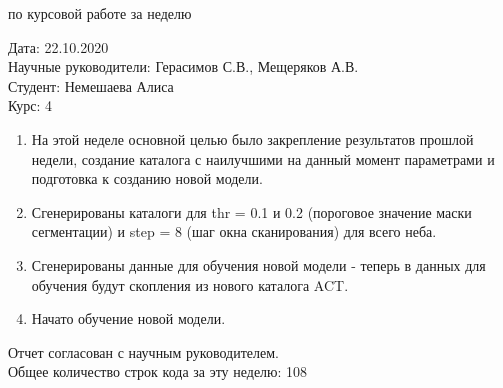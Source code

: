\documentclass{article}
\begin{document}
\begin{center}{ по курсовой работе за неделю\\}\end{center}
Дата: 22.10.2020\\
Научные руководители: Герасимов С.В., Мещеряков А.В.\\
Студент: Немешаева Алиса\\
Курс: 4\\

\renewcommand{\labelitemi}{$\blacksquare$}
\renewcommand\labelitemii{$\square$}
\begin{enumerate}
    \item На этой неделе основной целью было закрепление результатов прошлой недели, создание 
        каталога с наилучшими на данный момент параметрами и подготовка к созданию новой модели.\\
    \item Сгенерированы каталоги для thr = 0.1 и 0.2 (пороговое значение маски сегментации) и 
        step = 8 (шаг окна сканирования) для всего неба.\\
    \item Сгенерированы данные для обучения новой модели - теперь в данных для обучения будут 
        скопления из нового каталога ACT.\\
    \item Начато обучение новой модели.\\

\end{enumerate}

Отчет согласован с научным руководителем.\\
Общее количество строк кода за эту неделю: 108\\
\end{document}
